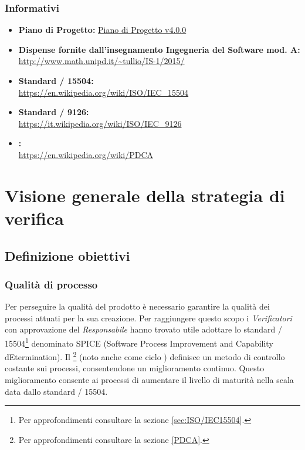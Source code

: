 \documentclass{scalatekids-article}
\begin{document}
\subsubsection{Informativi}
\begin{itemize}
\item\textbf{Piano di Progetto:} \href{run:./PianoDiProgetto\_v4.0.0.pdf}{Piano di Progetto v4.0.0}
\item\textbf{Dispense fornite dall'insegnamento Ingegneria del Software mod. A:}\\
  \url{http://www.math.unipd.it/~tullio/IS-1/2015/}
\item\textbf{Standard / 15504:}\\
  \url{https://en.wikipedia.org/wiki/ISO/IEC_15504}
\item\textbf{Standard / 9126:}\\
  \url{https://it.wikipedia.org/wiki/ISO/IEC_9126}
\item\textbf{:}\\
  \url{https://en.wikipedia.org/wiki/PDCA}
\end{itemize}
\newpage
\section{Visione generale della strategia di verifica}
\subsection{Definizione obiettivi}
\subsubsection{Qualità di processo}
Per perseguire la qualità del prodotto è necessario garantire la qualità dei processi attuati per la sua creazione. Per raggiungere questo scopo i \textit{Verificatori} con approvazione del \textit{Responsabile} hanno trovato utile adottare lo standard / 15504\footnote[1]{Per approfondimenti consultare la sezione \ref{sec:ISO/IEC15504}.} denominato SPICE (Software Process Improvement and Capability dEtermination). Il \footnote[2]{Per approfondimenti consultare la sezione \ref{PDCA}.} (noto anche come ciclo ) definisce un metodo di controllo costante sui processi, consentendone un miglioramento continuo. Questo miglioramento consente ai processi di aumentare il livello di maturità nella scala data dallo standard / 15504.
\end{document}
